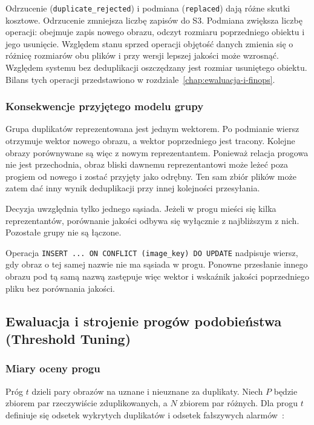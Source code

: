 Odrzucenie (\texttt{duplicate\_rejected}) i podmiana
(\texttt{replaced}) dają różne skutki kosztowe. Odrzucenie zmniejsza
liczbę zapisów do S3. Podmiana zwiększa liczbę operacji: obejmuje
zapis nowego obrazu, odczyt rozmiaru poprzedniego obiektu i jego
usunięcie. Względem stanu sprzed operacji objętość danych zmienia się
o różnicę rozmiarów obu plików i przy wersji lepszej jakości może
wzrosnąć. Względem systemu bez deduplikacji oszczędzany jest rozmiar
usuniętego obiektu. Bilans tych operacji przedstawiono
w rozdziale~\ref{chap:ewaluacja-i-finops}.

\subsubsection{Konsekwencje przyjętego modelu grupy}

Grupa duplikatów reprezentowana jest jednym wektorem. Po podmianie
wiersz otrzymuje wektor nowego obrazu, a wektor poprzedniego jest
tracony. Kolejne obrazy porównywane są więc z nowym reprezentantem.
Ponieważ relacja progowa nie jest przechodnia, obraz bliski dawnemu
reprezentantowi może leżeć poza progiem od nowego i zostać przyjęty
jako odrębny. Ten sam zbiór plików może zatem dać inny wynik
deduplikacji przy innej kolejności przesyłania.

Decyzja uwzględnia tylko jednego sąsiada. Jeżeli w progu mieści się
kilka reprezentantów, porównanie jakości odbywa się wyłącznie
z najbliższym z nich. Pozostałe grupy nie są łączone.

Operacja \texttt{INSERT ... ON CONFLICT (image\_key) DO UPDATE}
nadpisuje wiersz, gdy obraz o tej samej nazwie nie ma sąsiada
w progu. Ponowne przesłanie innego obrazu pod tą samą nazwą zastępuje
więc wektor i wskaźnik jakości poprzedniego pliku bez porównania
jakości.

\subsection{Ewaluacja i strojenie progów podobieństwa (Threshold Tuning)}
\label{sec:ewaluacja-progów}

\subsubsection{Miary oceny progu}

Próg \(t\) dzieli pary obrazów na uznane i nieuznane za duplikaty.
Niech \(P\) będzie zbiorem par rzeczywiście zduplikowanych, a \(N\)
zbiorem par różnych. Dla progu \(t\) definiuje się odsetek wykrytych
duplikatów i odsetek fałszywych alarmów~\cite{fawcett2006roc}:

